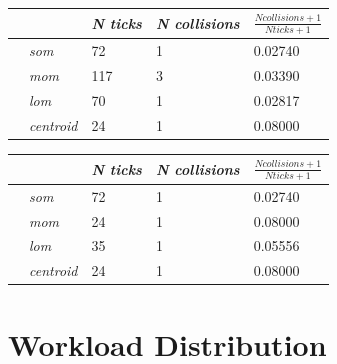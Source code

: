 \documentclass[conference]{IEEEtran}
\begin{document}
\begin{center}
\begin{tabular}{ | m{2.8em} | m{3em} | m{2.8em} | m{5em} | m{5.2em} | }
\hline
{} & \textit{N ticks} & \textit{N collisions} & $\frac{N collisions + 1}{N ticks + 1}$ \\
\hline
{} & \textit{som} & 72 & 1 & 0.02740 \\
 & \textit{mom} & 117 & 3 & 0.03390 \\
 & \textit{lom} & 70 & 1 & 0.02817 \\
 & \textit{centroid} & 24 & 1 & 0.08000 \\
\hline
\end{tabular}
\label{table:ps10e2amax}
\end{center}

\begin{center}
\begin{tabular}{ | m{2.8em} | m{3em} | m{2.8em} | m{5em} | m{5.2em} | }
\hline
{} & \textit{N ticks} & \textit{N collisions} & $\frac{N collisions + 1}{N ticks + 1}$ \\
\hline
{} & \textit{som} & 72 & 1 & 0.02740 \\
 & \textit{mom} & 24 & 1 & 0.08000 \\
 & \textit{lom} & 35 & 1 & 0.05556 \\
 & \textit{centroid} & 24 & 1 & 0.08000 \\
\hline
\end{tabular}
\label{table:ps10e2asum}
\end{center}


\newpage

\section{Workload Distribution}



\end{document}

